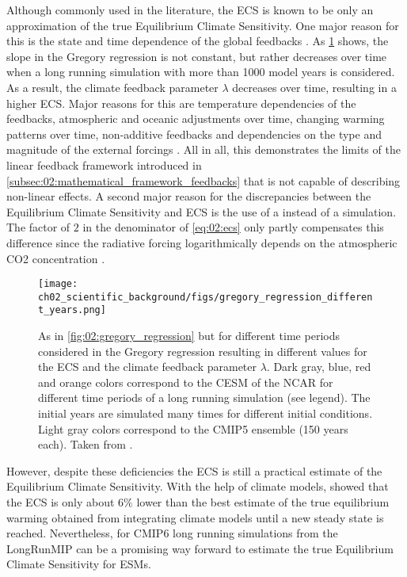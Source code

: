 Although commonly used in the literature, the \ac{ECS} is known to be only an
approximation of the true Equilibrium Climate Sensitivity. One major reason for
this is the state and time dependence of the global feedbacks
\autocite{Knutti2015, Knutti2017}. As
\cref{fig:02:gregory_regression_different_years} shows, the slope in the
Gregory regression is not constant, but rather decreases over time when a long
running  simulation with more than 1000 model years is considered.
As a result, the climate feedback parameter $\lambda$ decreases over time,
resulting in a higher \ac{ECS}. Major reasons for this are temperature
dependencies of the feedbacks, atmospheric and oceanic adjustments over time,
changing warming patterns over time, non-additive feedbacks and dependencies on
the type and magnitude of the external forcings \autocite{Knutti2017}. All in
all, this demonstrates the limits of the linear feedback framework introduced
in \cref{subsec:02:mathematical_framework_feedbacks} that is not capable of
describing non-linear effects. A second major reason for the discrepancies
between the Equilibrium Climate Sensitivity and \ac{ECS} is the use of a
 instead of a  simulation. The factor of $2$ in the
denominator of \cref{eq:02:ecs} only partly compensates this difference since
the radiative forcing logarithmically depends on the atmospheric \ac{CO2}
concentration \autocite{Huang2014}.

\begin{figure}[t]
  \centering
  \texttt{[image: 
    ch02\_scientific\_background/figs/gregory\_regression\_different\_years.png]}
  \caption{As in \cref{fig:02:gregory_regression} but for different time
    periods considered in the Gregory regression resulting in different values
    for the \acf{ECS} and the climate feedback parameter $\lambda$. Dark gray,
    blue, red and orange colors correspond to the \acf{CESM} of the \acf{NCAR}
    for different time periods of a long running simulation (see legend). The
    initial years are simulated many times for different initial conditions.
    Light gray colors correspond to the \acs{CMIP}5 ensemble (150 years each).
    Taken from \textcite{Knutti2017}.}
  \label{fig:02:gregory_regression_different_years}
\end{figure}

However, despite these deficiencies the \ac{ECS} is still a practical estimate
of the Equilibrium Climate Sensitivity. With the help of climate models,
\textcite{Sherwood2020} showed that the \ac{ECS} is only about $6 \unit{\%}$
lower than the best estimate of the true equilibrium warming obtained from
integrating climate models until a new steady state is reached. Nevertheless,
for \acs{CMIP}6 long running simulations from the \ac{LongRunMIP}
\autocite{Rugenstein2019} can be a promising way forward to estimate the true
Equilibrium Climate Sensitivity for \acp{ESM}.


